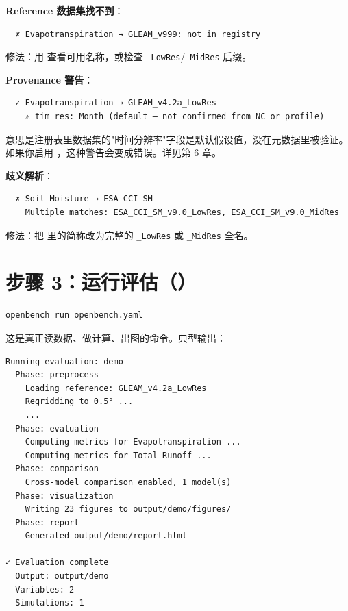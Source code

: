 \textbf{Reference 数据集找不到}：

\begin{verbatim}
  ✗ Evapotranspiration → GLEAM_v999: not in registry
\end{verbatim}

修法：用  查看可用名称，或检查 \texttt{\_LowRes}/\texttt{\_MidRes} 后缀。

\textbf{Provenance 警告}：

\begin{verbatim}
  ✓ Evapotranspiration → GLEAM_v4.2a_LowRes
    ⚠ tim_res: Month (default — not confirmed from NC or profile)
\end{verbatim}

意思是注册表里数据集的"时间分辨率"字段是默认假设值，没在元数据里被验证。如果你启用 ，这种警告会变成错误。详见第 6 章。

\textbf{歧义解析}：

\begin{verbatim}
  ✗ Soil_Moisture → ESA_CCI_SM
    Multiple matches: ESA_CCI_SM_v9.0_LowRes, ESA_CCI_SM_v9.0_MidRes
\end{verbatim}

修法：把  里的简称改为完整的 \texttt{\_LowRes} 或 \texttt{\_MidRes} 全名。

\section{步骤 3：运行评估（）}

\begin{verbatim}
openbench run openbench.yaml
\end{verbatim}

这是真正读数据、做计算、出图的命令。典型输出：

\begin{exampleBox}
\begin{verbatim}
Running evaluation: demo
  Phase: preprocess
    Loading reference: GLEAM_v4.2a_LowRes
    Regridding to 0.5° ...
    ...
  Phase: evaluation
    Computing metrics for Evapotranspiration ...
    Computing metrics for Total_Runoff ...
  Phase: comparison
    Cross-model comparison enabled, 1 model(s)
  Phase: visualization
    Writing 23 figures to output/demo/figures/
  Phase: report
    Generated output/demo/report.html

✓ Evaluation complete
  Output: output/demo
  Variables: 2
  Simulations: 1
\end{verbatim}
\end{exampleBox}

